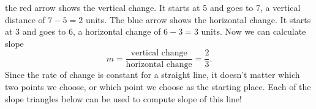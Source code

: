 the red arrow shows the vertical change. It starts at 5 and goes to 7, a vertical distance of $7-5=2$ units. The blue arrow shows the horizontal change. It starts at 3 and goes to 6, a horizontal change of $6-3=3$ units. Now we can calculate slope \[m = \frac{\text{vertical change}}{\text{horizontal change}} = \frac{2}{3}.\] Since the rate of change is constant for a straight line, it doesn't matter which two points we choose, or which point we choose as the starting place. Each of the slope triangles below can be used to compute slope of this line!

\begin{center}
\begin{minipage}{0.32\textwidth}
	\centering
%
\end{minipage}
%
\begin{minipage}{0.32\textwidth}
	\centering
	\begin{tikzpicture}

\end{tikzpicture}
\end{minipage}
\end{center}
